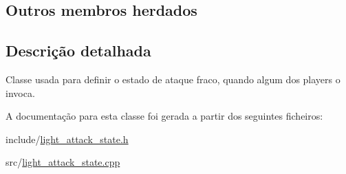 \subsection*{Outros membros herdados}


\subsection{Descrição detalhada}
Classe usada para definir o estado de ataque fraco, quando algum dos players o invoca. 

A documentação para esta classe foi gerada a partir dos seguintes ficheiros\+:\begin{DoxyCompactItemize}
\item 
include/\mbox{\hyperlink{light__attack__state_8h}{light\+\_\+attack\+\_\+state.\+h}}\item 
src/\mbox{\hyperlink{light__attack__state_8cpp}{light\+\_\+attack\+\_\+state.\+cpp}}\end{DoxyCompactItemize}
